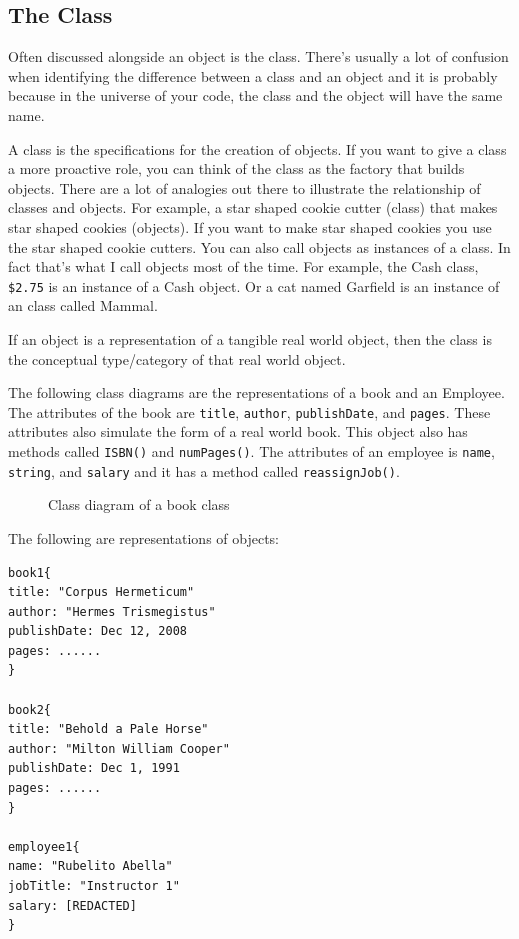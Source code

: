 \subsection{The
Class}\label{object-oriented-programming-paradigm.md__the-class}

Often discussed alongside an object is the class. There's usually a lot
of confusion when identifying the difference between a class and an
object and it is probably because in the universe of your code, the
class and the object will have the same name.

A class is the specifications for the creation of objects. If you want
to give a class a more proactive role, you can think of the class as the
factory that builds objects. There are a lot of analogies out there to
illustrate the relationship of classes and objects. For example, a star
shaped cookie cutter (class) that makes star shaped cookies (objects).
If you want to make star shaped cookies you use the star shaped cookie
cutters. You can also call objects as instances of a class. In fact
that's what I call objects most of the time. For example, the Cash
class, \texttt{\$2.75} is an instance of a Cash object. Or a cat named
Garfield is an instance of an class called Mammal.

If an object is a representation of a tangible real world object, then
the class is the conceptual type/category of that real world object.

The following class diagrams are the representations of a book and an
Employee. The attributes of the book are \texttt{title},
\texttt{author}, \texttt{publishDate}, and \texttt{pages}. These
attributes also simulate the form of a real world book. This object also
has methods called \texttt{ISBN()} and \texttt{numPages()}. The
attributes of an employee is \texttt{name}, \texttt{string}, and
\texttt{salary} and it has a method called \texttt{reassignJob()}.

\begin{figure}
\centering
\pandocbounded{}
\caption{Class diagram of a book class}
\end{figure}

The following are representations of objects:

\begin{verbatim}
book1{
title: "Corpus Hermeticum"
author: "Hermes Trismegistus"
publishDate: Dec 12, 2008
pages: ......
}

book2{
title: "Behold a Pale Horse"
author: "Milton William Cooper"
publishDate: Dec 1, 1991
pages: ......
}

employee1{
name: "Rubelito Abella"
jobTitle: "Instructor 1"
salary: [REDACTED]
}
\end{verbatim}

